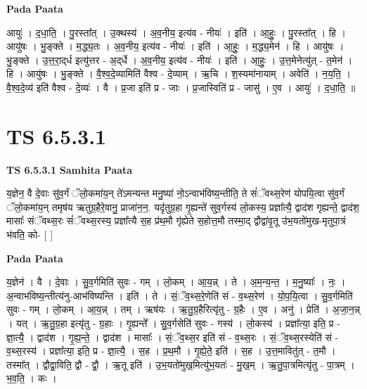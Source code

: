 \documentclass[17pt]{extarticle}
\begin{document}
\textbf{Pada Paata} \newline

आयुः॑ । द॒धा॒ति॒ । पु॒रस्ता᳚त् । उ॒क्थस्य॑ । अ॒व॒नीय॒ इत्य॑व - नीयः॑ । इति॑ । आ॒हुः॒ । पु॒रस्ता᳚त् । हि । आयु॑षः । भु॒ङ्क्ते । म॒द्ध्य॒तः । अ॒व॒नीय॒ इत्य॑व - नीयः॑ । इति॑ । आ॒हुः॒ । म॒द्ध्य॒मेन॑ । हि । आयु॑षः । भु॒ङ्क्ते । उ॒त्त॒रा॒द्‌र्ध इत्यु॑त्तर - अ॒द्‌र्धे । अ॒व॒नीय॒ इत्य॑व - नीयः॑ । इति॑ । आ॒हुः॒ । उ॒त्त॒मेनेत्यु॑त् - त॒मेन॑ । हि । आयु॑षः । भु॒ङ्क्ते । वै॒श्व॒दे॒व्यामिति॑ वैश्व - दे॒व्याम् । ऋ॒चि । श॒स्यमा॑नायाम् । अवेति॑ । न॒य॒ति॒ । वै॒श्व॒दे॒व्य॑ इति॑ वैश्व - दे॒व्यः॑ । वै । प्र॒जा इति॑ प्र - जाः । प्र॒जास्विति॑ प्र - जासु॑ । ए॒व । आयुः॑ । द॒धा॒ति॒ ॥  \newline




\section*{ TS 6.5.3.1 }

\textbf{TS 6.5.3.1 } \newline
\textbf{Samhita Paata} \newline

य॒ज्ञेन॒ वै दे॒वाः सु॑व॒र्गं ॅलो॒कमा॑य॒न् ते॑ऽमन्यन्त मनु॒ष्या॑ नो॒ऽन्वाभ॑विष्य॒न्तीति॒ ते सं॑ॅवथ्स॒रेण॑ योपयि॒त्वा सु॑व॒र्गं ॅलो॒कमा॑य॒न् तमृष॑य ऋतुग्र॒हैरे॒वानु॒ प्राजा॑न॒न॒. यदृ॑तुग्र॒हा गृ॒ह्यन्ते॑ सुव॒र्गस्य॑ लो॒कस्य॒ प्रज्ञा᳚त्यै॒ द्वाद॑श गृह्यन्ते॒ द्वाद॑श॒ मासाः᳚ संॅवथ्स॒रः सं॑ॅवथ्स॒रस्य॒ प्रज्ञा᳚त्यै स॒ह प्र॑थ॒मौ गृ॑ह्येते स॒होत्त॒मौ तस्मा॒द् द्वौद्वा॑वृ॒तू उ॑भ॒यतो॑मुख-मृतुपा॒त्रं भ॑वति॒ को- [  ] \newline

\textbf{Pada Paata} \newline

य॒ज्ञेन॑ । वै । दे॒वाः । सु॒व॒र्गमिति॑ सुवः - गम् । लो॒कम् । आ॒य॒न्न् । ते । अ॒म॒न्य॒न्त॒ । म॒नु॒ष्याः᳚ । नः॒ । अ॒न्वाभ॑विष्य॒न्तीत्य॑नु-आभ॑विष्यन्ति । इति॑ । ते । सं॒ॅव॒थ्स॒रे॒णेति॑ सं - व॒थ्स॒रेण॑ । यो॒प॒यि॒त्वा । सु॒व॒र्गमिति॑ सुवः - गम् । लो॒कम् । आ॒य॒न्न् । तम् । ऋष॑यः । ऋ॒तु॒ग्र॒हैरित्यृ॑तु - ग्र॒हैः । ए॒व । अनु॑ । प्रेति॑ । अ॒जा॒न॒न्न् । यत् । ऋ॒तु॒ग्र॒हा इत्यृ॑तु - ग्र॒हाः । गृ॒ह्यन्ते᳚ । सु॒व॒र्गसेति॑ सुवः - गस्य॑ । लो॒कस्य॑ । प्रज्ञा᳚त्या॒ इति॒ प्र - ज्ञा॒त्यै॒ । द्वाद॑श । गृ॒ह्य॒न्ते॒ । द्वाद॑श । मासाः᳚ । सं॒ॅव॒थ्स॒र इति॑ सं - व॒थ्स॒रः । सं॒ॅव॒थ्स॒रस्येति॑ सं - व॒थ्स॒रस्य॑ । प्रज्ञा᳚त्या॒ इति॒ प्र - ज्ञा॒त्यै॒ । स॒ह । प्र॒थ॒मौ । गृ॒ह्ये॒ते॒ इति॑ । स॒ह । उ॒त्त॒मावितु॑त् - त॒मौ । तस्मा᳚त् । द्वौद्वा॒विति॒ द्वौ - द्वौ॒ । ऋ॒तू इति॑ । उ॒भ॒यतो॑मुख॒मित्यु॑भ॒यतः॑ - मु॒ख॒म् । ऋ॒तु॒पा॒त्रमित्यृ॑तु - पा॒त्रम् । भ॒व॒ति॒ । कः ।  \newline
\end{document}
